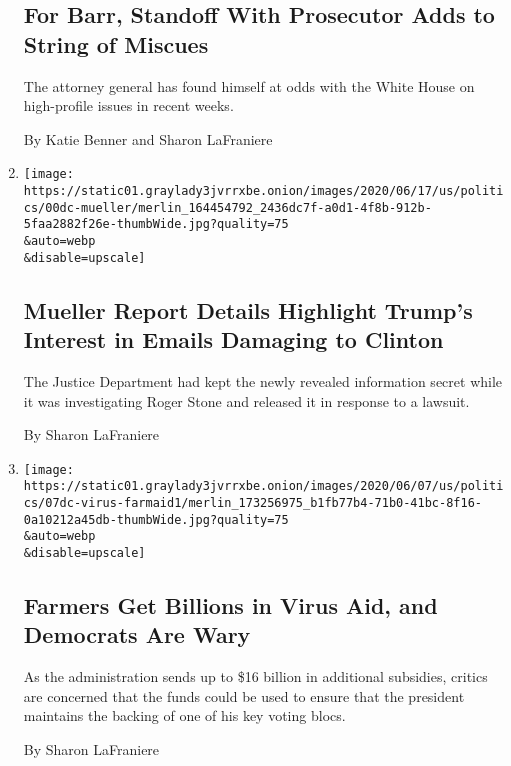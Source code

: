 \begin{enumerate}
  \hypertarget{for-barr-standoff-with-prosecutor-adds-to-string-of-miscues}{%
  \subsection{For Barr, Standoff With Prosecutor Adds to String of
  Miscues}\label{for-barr-standoff-with-prosecutor-adds-to-string-of-miscues}}

  The attorney general has found himself at odds with the White House on
  high-profile issues in recent weeks.

  By Katie Benner and Sharon LaFraniere
\item
  \href{/2020/06/19/us/politics/mueller-report-redactions-roger-stone.html}{}

  \texttt{[image: https://static01.graylady3jvrrxbe.onion/images/2020/06/17/us/politics/00dc-mueller/merlin\_164454792\_2436dc7f-a0d1-4f8b-912b-5faa2882f26e-thumbWide.jpg?quality=75\\\&auto=webp\\\&disable=upscale]}

  \hypertarget{mueller-report-details-highlight-trumps-interest-in-emails-damaging-to-clinton}{%
  \subsection{Mueller Report Details Highlight Trump's Interest in
  Emails Damaging to
  Clinton}\label{mueller-report-details-highlight-trumps-interest-in-emails-damaging-to-clinton}}

  The Justice Department had kept the newly revealed information secret
  while it was investigating Roger Stone and released it in response to
  a lawsuit.

  By Sharon LaFraniere
\item
  \href{/2020/06/07/us/politics/virus-trump-aid-farmers.html}{}

  \texttt{[image: https://static01.graylady3jvrrxbe.onion/images/2020/06/07/us/politics/07dc-virus-farmaid1/merlin\_173256975\_b1fb77b4-71b0-41bc-8f16-0a10212a45db-thumbWide.jpg?quality=75\\\&auto=webp\\\&disable=upscale]}

  \hypertarget{farmers-get-billions-in-virus-aid-and-democrats-are-wary}{%
  \subsection{Farmers Get Billions in Virus Aid, and Democrats Are
  Wary}\label{farmers-get-billions-in-virus-aid-and-democrats-are-wary}}

  As the administration sends up to \$16 billion in additional
  subsidies, critics are concerned that the funds could be used to
  ensure that the president maintains the backing of one of his key
  voting blocs.

  By Sharon LaFraniere
\end{enumerate}


